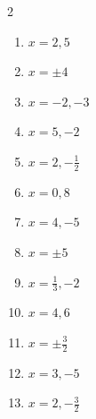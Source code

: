 \documentclass[11pt]{article}
\begin{document}
\begin{keybox}
\begin{multicols}{2}
\small
\begin{enumerate}[leftmargin=*,itemsep=3pt]
  \item $x=2,5$
  \item $x=\pm4$
  \item $x=-2,-3$
  \item $x=5,-2$
  \item $x=2,-\tfrac12$
  \item $x=0,8$
  \item $x=4,-5$
  \item $x=\pm5$
  \item $x=\tfrac13,-2$
  \item $x=4,6$
  \item $x=\pm\tfrac32$
  \item $x=3,-5$
  \item $x=2,-\tfrac32$
\end{enumerate}
\end{multicols}
\end{keybox}
\end{document}
